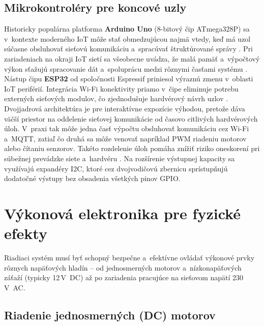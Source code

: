 \subsection{Mikrokontroléry pre koncové uzly}
\label{mikrokontrolery}

Historicky populárna platforma \textbf{Arduino Uno}
(8-bitový čip ATmega328P) sa v~kontexte moderného IoT môže
stať obmedzujúcou najmä vtedy, keď má uzol súčasne obsluhovať
sieťovú komunikáciu a~spracúvať štruktúrované správy
\cite{maier2017esp32}. Pri zariadeniach na okraji IoT sietí
sa všeobecne uvádza, že malá pamäť a~výpočtový výkon sťažujú
spracovanie dát a~spoluprácu medzi rôznymi časťami systému
\cite{azad2025iot}. Nástup čipu \textbf{ESP32} od spoločnosti
Espressif priniesol výraznú zmenu v~oblasti IoT periférií.
Integrácia Wi-Fi konektivity priamo v~čipe eliminuje potrebu
externých sieťových modulov, čo zjednodušuje hardvérový
návrh uzlov \cite{maier2017esp32}. Dvojjadrová architektúra
je pre interaktívne expozície výhodou, pretože dáva väčší
priestor na oddelenie sieťovej komunikácie od časovo citlivých
hardvérových úloh. V~praxi tak môže jedna časť výpočtu
obsluhovať komunikáciu cez Wi-Fi a~MQTT, zatiaľ čo druhá sa môže
venovať napríklad PWM riadeniu motorov alebo čítaniu senzorov.
Takéto rozdelenie úloh pomáha znížiť riziko oneskorení pri
súbežnej prevádzke siete a~hardvéru \cite{maier2017esp32}.
Na rozšírenie výstupnej kapacity
sa využívajú expandéry I2C, ktoré cez
dvojvodičovú zbernicu sprístupňujú dodatočné výstupy bez
obsadenia všetkých pinov GPIO.

\section{Výkonová elektronika pre fyzické efekty}
\label{vykonova-elektronika}

Riadiaci systém musí byť schopný bezpečne a~efektívne ovládať
výkonové prvky rôznych napäťových hladín -- od jednosmerných
motorov a~nízkonapäťových záťaží (typicky 12\,V~DC) až po
zariadenia pracujúce na sieťovom napätí 230\,V~AC.

\subsection{Riadenie jednosmerných (DC) motorov}
\label{dc-motory}

